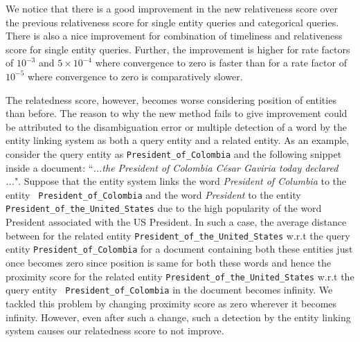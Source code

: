 \documentclass[10pt,a4paper]{article} %
\begin{document}
    \noindent We notice that there is a good improvement in the new relativeness score over the previous relativeness score for single entity queries and categorical queries. 
    There is also a nice improvement for combination of timeliness and relativeness score for single entity queries. 
    Further, the improvement is higher for rate factors of $10^{-3}$ and $5 \times 10^{-4}$ where convergence to zero
    is faster than for a rate factor of $10^{-5}$ where convergence to zero is comparatively slower.
    
    \noindent The relatedness score, however, becomes worse considering position of entities than before. 
    The reason to why the new method fails to give improvement could be attributed to the disambiguation error or 
    multiple detection of a word by the entity linking system as both a query entity and a related entity. 
    As an example, consider the query entity as {\tt President\_of\_Colombia} and the following snippet inside a document: ``{\em ...the President of Colombia C\'esar Gaviria today declared ...}". 
    Suppose that the entity system links the word {\em President of Columbia} to the entity {\tt 
    President\_of\_Colombia} and 
    the word {\em President} to the entity {\tt President\_of\_the\_United\_States} due to the high popularity of the 
    word President associated with the US President. In such a case, the average distance between for the related entity
    {\tt President\_of\_the\_United\_States} w.r.t the query entity {\tt President\_of\_Colombia} for a document 
    containing both these entities just once becomes zero since position is same for both these words and hence the 
    proximity score for the related entity {\tt President\_of\_the\_United\_States} w.r.t the query entity {\tt 
    President\_of\_Colombia} in the document becomes infinity. 
    We tackled this problem by changing proximity score as zero wherever it becomes infinity. 
    However, even after such a change, such a detection by the entity linking system causes our relatedness score to not improve.
\end{document}
